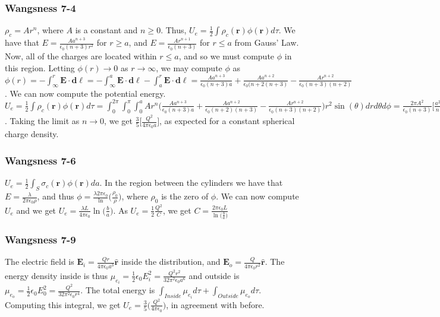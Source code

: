 \documentclass[crop=false,class=article,oneside]{standalone}
\begin{document}
        \subsubsection{Wangsness 7-4}
            $\rho_c = Ar^n$, where $A$ is a constant and $n\geq 0$.
            Thus, $U_e=\frac{1}{2}\int\rho_c(\mathbf{r})\phi(\mathbf{r})d\tau$.
            We have that $E=\frac{Aa^{n+3}}{\epsilon_0 (n+3)r^2}$
            for $r\geq a$, and $E=\frac{Ar^{n+1}}{\epsilon_0(n+3)}$ for
            $r\leq a$ from Gauss' Law. Now, all of the charges are located within
            $r\leq a$, and so we must compute $\phi$ in this region.
            Letting $\phi(r)\rightarrow 0$ as $r\rightarrow \infty$,
            we may compute $\phi$ as
            $\phi(r)=-\int_{\infty}^{r}\mathbf{E}\cdot\mathbf{d\ell}=-\int_{\infty}^{a}\mathbf{E}\cdot\mathbf{d\ell}- \int_{a}^{r}\mathbf{E}\cdot \mathbf{d\ell}= \frac{Aa^{n+3}}{\epsilon_0(n+3)a}+\frac{Aa^{n+2}}{\epsilon_0(n+2(n+3)}-\frac{Ar^{n+2}}{\epsilon_0(n+3)(n+2)}$.
            We can now compute the potential energy.
            $U_e=\frac{1}{2}\int\rho_c(\mathbf{r})\phi(\mathbf{r})d\tau=\int_{0}^{2\pi}\int_{0}^{\pi}\int_{0}^{a}Ar^n \bigg(\frac{Aa^{n+3}}{\epsilon_0(n+3)a}+\frac{Aa^{n+2}}{\epsilon_0(n+2)(n+3)}-\frac{Ar^{n+2}}{\epsilon_0(n+3)(n+2)}\bigg)r^2 \sin(\theta)dr d\theta d\phi = \frac{2\pi A^2}{\epsilon_0 (n+3)}\bigg[\frac{a^{2n+5}}{n+3}+\frac{a^{2n+5}}{(n+2)(n+3)}-\frac{a^{2n+5}}{(n+2)(2n+5)}\bigg]$.
            Taking the limit as $n\rightarrow 0$, we get $\frac{3}{5}\bigg[\frac{Q^2}{4\pi \epsilon_0 a}\bigg]$,
            as expected for a constant spherical charge density.
        \subsubsection{Wangsness 7-6}
            $U_e = \frac{1}{2}\int_{S}\sigma_c(\mathbf{r})\phi(\mathbf{r})da$.
            In the region between the cylinders we have that
            $E=\frac{\lambda}{2\pi\epsilon_0\rho}$, and thus
            $\phi= \frac{\lambda 2\pi \epsilon_0}\ln\big(\frac{\rho_0}{\rho}\big)$,
            where $\rho_0$ is the zero of $\phi$. We can now compute $U_e$
            and we get $U_e = \frac{\lambda L}{4\pi\epsilon_0}\ln\big(\frac{b}{a}\big)$.
            As $U_e = \frac{1}{2}\frac{Q^2}{C}$, we get
            $C=\frac{2\pi \epsilon_0 L}{\ln\big(\frac{b}{a}\big)}$
        \subsubsection{Wangsness 7-9}
            The electric field is $\mathbf{E}_i = \frac{Qr}{4\pi \epsilon_0 a^3}\hat{\mathbf{r}}$
            inside the distribution, and $\mathbf{E}_o = \frac{Q}{4\pi\epsilon_0r^2}\hat{\mathbf{r}}$.
            The energy density inside is thus
            $\mu_{e_i} = \frac{1}{2}\epsilon_0 E_i^2=\frac{Q^2r^2}{32\pi^2 \epsilon_0 a^6}$
            and outside is $\mu_{e_o} = \frac{1}{2}\epsilon_0 E_0^2 = \frac{Q^2}{32\pi^2 \epsilon_0 r^4}$.
            The total energy is $\int_{Inside} \mu_{e_i}d\tau + \int_{Outside} \mu_{e_o}d\tau$.
            Computing this integral, we get $U_e = \frac{3}{5}\bigg( \frac{Q^2}{4\pi \epsilon_0}\bigg)$,
            in agreement with before.
\end{document}
